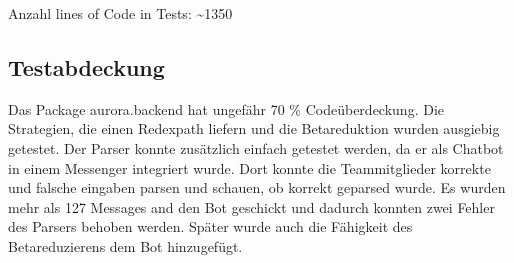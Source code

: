\documentclass[parskip=full,11pt,twoside]{scrartcl}
\begin{document}
Anzahl lines of Code in Tests: \textasciitilde 1350


\subsection{Testabdeckung}
Das Package aurora.backend hat ungefähr 70 \% Codeüberdeckung.
Die Strategien, die einen Redexpath liefern und die Betareduktion wurden ausgiebig getestet.
Der Parser konnte zusätzlich einfach getestet werden, da er als Chatbot in einem Messenger integriert wurde.
Dort konnte die Teammitglieder korrekte und falsche eingaben parsen und schauen,
ob korrekt geparsed wurde.
Es wurden mehr als 127 Messages and den Bot geschickt und dadurch konnten zwei
Fehler des Parsers behoben werden.
Später wurde auch die Fähigkeit des Betareduzierens dem Bot hinzugefügt.
\newpage
\end{document}
